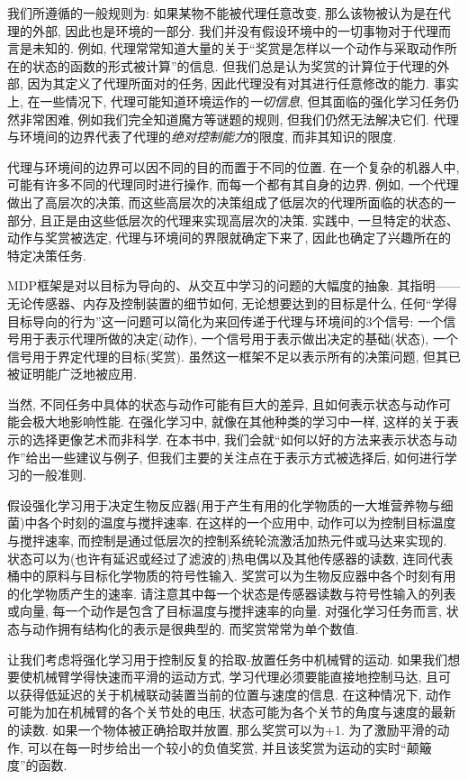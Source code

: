 我们所遵循的一般规则为: 如果某物不能被代理任意改变, 那么该物被认为是在代理的外部, 因此也是环境的一部分. 我们并没有假设环境中的一切事物对于代理而言是未知的. 例如, 代理常常知道大量的关于``奖赏是怎样以一个动作与采取动作所在的状态的函数的形式被计算''的信息. 但我们总是认为奖赏的计算位于代理的外部, 因为其定义了代理所面对的任务, 因此代理没有对其进行任意修改的能力. 事实上, 在一些情况下, 代理可能知道环境运作的\emph{一切信息}, 但其面临的强化学习任务仍然非常困难, 例如我们完全知道魔方等谜题的规则, 但我们仍然无法解决它们. 代理与环境间的边界代表了代理的\emph{绝对控制能力}的限度, 而非其知识的限度.

代理与环境间的边界可以因不同的目的而置于不同的位置. 在一个复杂的机器人中, 可能有许多不同的代理同时进行操作, 而每一个都有其自身的边界. 例如, 一个代理做出了高层次的决策, 而这些高层次的决策组成了低层次的代理所面临的状态的一部分, 且正是由这些低层次的代理来实现高层次的决策. 实践中, 一旦特定的状态、动作与奖赏被选定, 代理与环境间的界限就确定下来了, 因此也确定了兴趣所在的特定决策任务.

MDP框架是对以目标为导向的、从交互中学习的问题的大幅度的抽象. 其指明——无论传感器、内存及控制装置的细节如何, 无论想要达到的目标是什么, 任何``学得目标导向的行为''这一问题可以简化为来回传递于代理与环境间的3个信号: 一个信号用于表示代理所做的决定(动作), 一个信号用于表示做出决定的基础(状态), 一个信号用于界定代理的目标(奖赏). 虽然这一框架不足以表示所有的决策问题, 但其已被证明能广泛地被应用.

当然, 不同任务中具体的状态与动作可能有巨大的差异, 且如何表示状态与动作可能会极大地影响性能. 在强化学习中, 就像在其他种类的学习中一样, 这样的关于表示的选择更像艺术而非科学. 在本书中, 我们会就``如何以好的方法来表示状态与动作''给出一些建议与例子, 但我们主要的关注点在于表示方式被选择后, 如何进行学习的一般准则.

\begin{exam}[例3.1 生物反应器]
假设强化学习用于决定生物反应器(用于产生有用的化学物质的一大堆营养物与细菌)中各个时刻的温度与搅拌速率. 在这样的一个应用中, 动作可以为控制目标温度与搅拌速率, 而控制是通过低层次的控制系统轮流激活加热元件或马达来实现的. 状态可以为(也许有延迟或经过了滤波的)热电偶以及其他传感器的读数, 连同代表桶中的原料与目标化学物质的符号性输入. 奖赏可以为生物反应器中各个时刻有用的化学物质产生的速率. 请注意其中每一个状态是传感器读数与符号性输入的列表或向量, 每一个动作是包含了目标温度与搅拌速率的向量. 对强化学习任务而言, 状态与动作拥有结构化的表示是很典型的. 而奖赏常常为单个数值.
\end{exam}

\begin{exam}[拾置机器人]
让我们考虑将强化学习用于控制反复的拾取-放置任务中机械臂的运动. 如果我们想要使机械臂学得快速而平滑的运动方式, 学习代理必须要能直接地控制马达, 且可以获得低延迟的关于机械联动装置当前的位置与速度的信息. 在这种情况下, 动作可能为加在机械臂的各个关节处的电压, 状态可能为各个关节的角度与速度的最新的读数. 如果一个物体被正确拾取并放置, 那么奖赏可以为+1. 为了激励平滑的动作, 可以在每一时步给出一个较小的负值奖赏, 并且该奖赏为运动的实时``颠簸度''的函数.
\end{exam}

